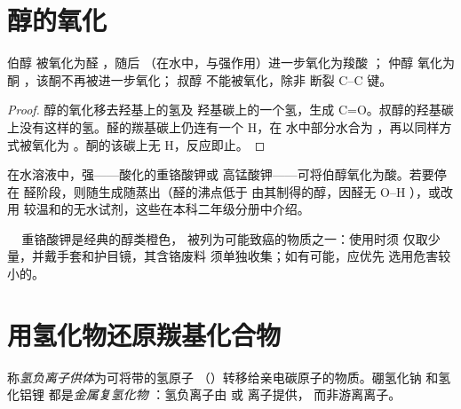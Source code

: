 \section{醇的氧化}

\begin{proposition}[醇被氧化后的产物]\label{prop:b1:organic-redox:alcohol-oxidation}
伯醇  被氧化为醛 ，随后
（在水中，与强作用）进一步氧化为羧酸 ；
仲醇  氧化为酮 ，该酮不再被进一步氧化；
叔醇  不能被氧化，除非
断裂 C--C 键。
\end{proposition}

\begin{proof}
醇的氧化移去羟基上的氢及
羟基碳上的一个氢，生成 C=O。叔醇的羟基碳
上没有这样的氢。醛的羰基碳上仍连有一个 H，在
水中部分水合为 ，再以同样方式被氧化为
。酮的该碳上无 H，反应即止。
\end{proof}

在水溶液中，强——酸化的重铬酸钾或
高锰酸钾——可将伯醇氧化为酸。若要停在
醛阶段，则随生成随蒸出（醛的沸点低于
由其制得的醇，因醛无 O--H ），或改用
较温和的无水试剂，这些在本科二年级分册中介绍。

\begin{safety}{\,\,\,\,\,}
重铬酸钾是经典的醇类橙色，
被列为可能致癌的物质之一：使用时须
仅取少量，并戴手套和护目镜，其含铬废料
须单独收集；如有可能，应优先
选用危害较小的。
\end{safety}

\section{用氢化物还原羰基化合物}

\begin{definition}[氢负离子供体]\label{def:b1:organic-redox:hydride-donor}
称\emph{氢负离子供体}为可将带的氢原子
（）转移给亲电碳原子的物质。硼氢化钠
 和氢化铝锂  都是\emph{金属复氢化物}
：氢负离子由  或  离子提供，
而非游离离子。
\end{definition}

